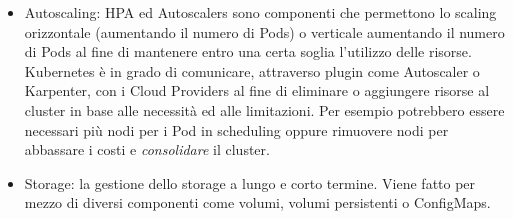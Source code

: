 \documentclass[12pt,a4paper,openright,twoside]{book}
\begin{document}
\begin{itemize}
{        È sempre necessario un Ingress Controller per applicare le regole di routing, questo può essere scelto dall'utente o viene fornito dal cloud provider come nel caso di AKS, GKE o OKE. 
    }
    \item {
        Autoscaling: HPA ed Autoscalers sono componenti che permettono lo scaling orizzontale (aumentando il numero di Pods) o verticale aumentando il numero di Pods al fine di mantenere entro una certa soglia l'utilizzo delle risorse.\\
        Kubernetes è in grado di comunicare, attraverso plugin come Autoscaler o Karpenter, con i Cloud Providers al fine di eliminare o aggiungere risorse al cluster in base alle necessità ed alle limitazioni. Per esempio potrebbero essere necessari più nodi per i Pod in scheduling oppure rimuovere nodi per abbassare i costi e \textit{consolidare} il cluster.
    }
    \item {
        Storage: la gestione dello storage a lungo e corto termine. Viene fatto per mezzo di diversi componenti come volumi, volumi persistenti o ConfigMaps.
    }
\end{itemize}
\end{document}
